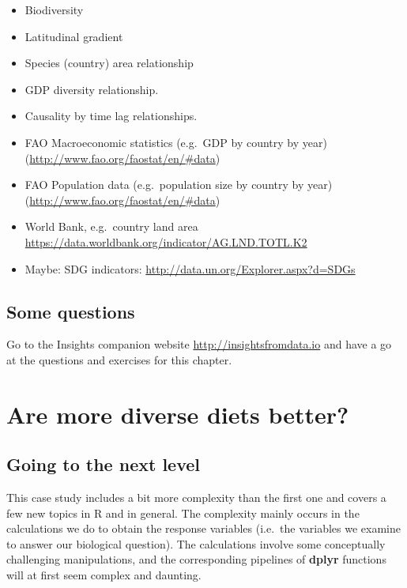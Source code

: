 \documentclass[]{book}
\providecommand{\tightlist}{%
  \setlength{\itemsep}{0pt}\setlength{\parskip}{0pt}}
\begin{document}
\begin{itemize}
\tightlist
\item
  Biodiversity
\item
  Latitudinal gradient
\item
  Species (country) area relationship
\item
  GDP diversity relationship.
\item
  Causality by time lag relationships.
\item
  FAO Macroeconomic statistics (e.g.~GDP by country by year) (\url{http://www.fao.org/faostat/en/\#data})
\item
  FAO Population data (e.g.~population size by country by year) (\url{http://www.fao.org/faostat/en/\#data})
\item
  World Bank, e.g.~country land area \url{https://data.worldbank.org/indicator/AG.LND.TOTL.K2}
\item
  Maybe: SDG indicators: \url{http://data.un.org/Explorer.aspx?d=SDGs}
\end{itemize}

\hypertarget{some-questions}{%
\section{Some questions}\label{some-questions}}

Go to the Insights companion website \url{http://insightsfromdata.io} and have a go at the questions and exercises for this chapter.

\hypertarget{WFD-3}{%
\chapter{Are more diverse diets better?}\label{WFD-3}}

\hypertarget{going-to-the-next-level}{%
\section{Going to the next level}\label{going-to-the-next-level}}

This case study includes a bit more complexity than the first one and covers a few new topics in R and in general. The complexity mainly occurs in the calculations we do to obtain the response variables (i.e.~the variables we examine to answer our biological question). The calculations involve some conceptually challenging manipulations, and the corresponding pipelines of \textbf{dplyr} functions will at first seem complex and daunting.
\end{document}
